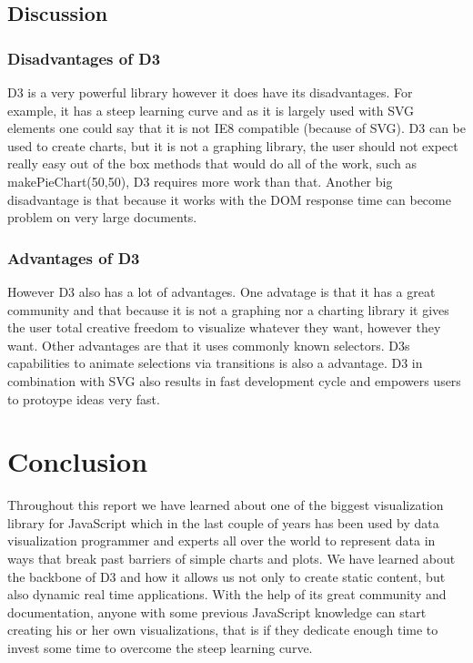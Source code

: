 \documentclass{bioinfo}
\begin{document}
\subsection{Discussion}
\subsubsection{Disadvantages of D3}
\hfill \break
D3 is a very powerful library however it does have its disadvantages. For example, it has a steep learning curve and as it is largely used with SVG elements one could say that it is not IE8 compatible (because of SVG).
D3 can be used to create charts, but it is not a graphing library, the user should not expect really easy out of the box methods that would do all of the work, such as makePieChart(50,50), D3 requires more work than that. Another big disadvantage is that because it works with the DOM response time can become problem on very large documents.

\subsubsection{Advantages of D3}
\hfill \break
However D3 also has a lot of advantages. One advatage is that it has a great community and that because it is not a graphing nor a charting library it gives the user total creative freedom to visualize whatever they want, however they want. Other advantages are that it uses commonly known selectors.
D3s capabilities to animate selections via transitions is also a advantage.
D3 in combination with SVG also results in fast development cycle and empowers users to protoype ideas very fast.


\section{Conclusion}
Throughout this report we have learned about one of the biggest visualization library for JavaScript which in the last couple of years has been used by data visualization programmer and experts all over the world to represent data in ways that break past barriers of simple charts and plots.
We have learned about the backbone of D3 and how it allows us not only to create static content, but also dynamic real time applications. With the help of its great community and documentation, anyone with some previous JavaScript knowledge can start creating his or her own visualizations, that is if they dedicate enough time to invest some time to overcome the steep learning curve.
\end{document}
